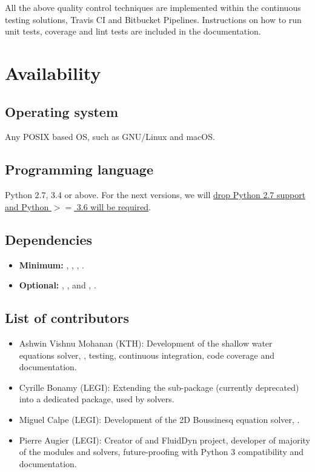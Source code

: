 All the above quality control techniques are implemented within the continuous
testing solutions, Travis CI and Bitbucket Pipelines. Instructions on how to
run unit tests, coverage and lint tests are included in the documentation.

\section{Availability}
\vspace{0.5cm}
\subsection{Operating system}

Any POSIX based OS, such as GNU/Linux and macOS.

\subsection{Programming language}

Python 2.7, 3.4 or above. For the next versions, we will
\href{https://python3statement.org/}{drop Python 2.7 support and Python $>=$
3.6 will be required}.

\subsection{Dependencies}

\begin{itemize}
\item {\bf Minimum:} , \Numpy, , 
\cite[and FFT libraries, see][]{fluidfft}.
\item {\bf Optional:} \Scipy, ,  and
, .
\end{itemize}

\subsection{List of contributors}

\begin{itemize}
\item Ashwin Vishnu Mohanan (KTH): Development of the shallow water equations
solver, , testing, continuous integration,
code coverage and documentation.
\item Cyrille Bonamy (LEGI): Extending the sub-package
 (currently deprecated) into a
dedicated package,  used by  solvers.
\item Miguel Calpe (LEGI): Development of the 2D Boussinesq equation solver,
.
\item Pierre Augier (LEGI): Creator of  and FluidDyn project,
developer of majority of the modules and solvers, future-proofing with Python 3
compatibility and documentation.
\end{itemize}


